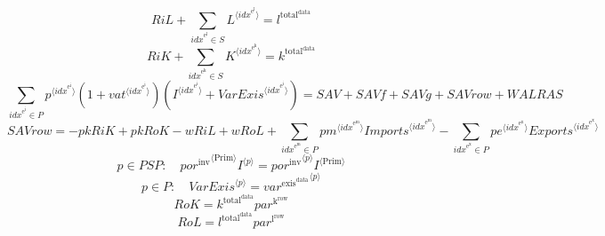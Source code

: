 \begin{equation}
{R\!i\!L} + \sum_{{i\!d\!x}^{\mathrm{e}^{\mathrm{l}}}\in S} {L}^{\langle {i\!d\!x}^{\mathrm{e}^{\mathrm{l}}}\rangle} = l^{\mathrm{total}^{\mathrm{data}}}
\end{equation}
\begin{equation}
{R\!i\!K} + \sum_{{i\!d\!x}^{\mathrm{e}^{\mathrm{k}}}\in S} {K}^{\langle {i\!d\!x}^{\mathrm{e}^{\mathrm{k}}}\rangle} = k^{\mathrm{total}^{\mathrm{data}}}
\end{equation}
\begin{equation}
\sum_{{i\!d\!x}^{\mathrm{e}^{\mathrm{i}}}\in P} {{p}^{\langle {i\!d\!x}^{\mathrm{e}^{\mathrm{i}}}\rangle}} \left(1 + {{v\!a\!t}}^{\langle {i\!d\!x}^{\mathrm{e}^{\mathrm{i}}}\rangle}\right) \left({I}^{\langle {i\!d\!x}^{\mathrm{e}^{\mathrm{i}}}\rangle} + {{V\!a\!r\!E\!x\!i\!s}}^{\langle {i\!d\!x}^{\mathrm{e}^{\mathrm{i}}}\rangle}\right) = {S\!A\!V} + {S\!A\!V\!f} + {S\!A\!V\!g} + {S\!A\!V\!r\!o\!w} + {W\!A\!L\!R\!A\!S}
\end{equation}
\begin{equation}
{S\!A\!V\!r\!o\!w} = -{{p\!k}} {{R\!i\!K}} + {{p\!k}} {{R\!o\!K}} - {w} {{R\!i\!L}} + {w} {{R\!o\!L}} + \sum_{{i\!d\!x}^{\mathrm{e}^{\mathrm{m}}}\in P} {{{p\!m}}^{\langle {i\!d\!x}^{\mathrm{e}^{\mathrm{m}}}\rangle}} {{{I\!m\!p\!o\!r\!t\!s}}^{\langle {i\!d\!x}^{\mathrm{e}^{\mathrm{m}}}\rangle}} - \sum_{{i\!d\!x}^{\mathrm{e}^{\mathrm{x}}}\in P} {{{p\!e}}^{\langle {i\!d\!x}^{\mathrm{e}^{\mathrm{x}}}\rangle}} {{{E\!x\!p\!o\!r\!t\!s}}^{\langle {i\!d\!x}^{\mathrm{e}^{\mathrm{x}}}\rangle}}
\end{equation}
\begin{equation}
p\in {P\!S\!P}\colon\quad {{{p\!o\!r}^{\mathrm{inv}}}^{\langle \mathrm{\mathrm{Prim}}\rangle}} {{I}^{\langle p\rangle}} = {{{p\!o\!r}^{\mathrm{inv}}}^{\langle p\rangle}} {{I}^{\langle \mathrm{Prim}\rangle}}
\end{equation}
\begin{equation}
p\in P\colon\quad {{V\!a\!r\!E\!x\!i\!s}}^{\langle p\rangle} = {{v\!a\!r}^{\mathrm{exis}^{\mathrm{data}}}}^{\langle p\rangle}
\end{equation}
\begin{equation}
{R\!o\!K} = {k^{\mathrm{total}^{\mathrm{data}}}} {{p\!a\!r}^{\mathrm{k}^{\mathrm{row}}}}
\end{equation}
\begin{equation}
{R\!o\!L} = {l^{\mathrm{total}^{\mathrm{data}}}} {{p\!a\!r}^{\mathrm{l}^{\mathrm{row}}}}
\end{equation}
